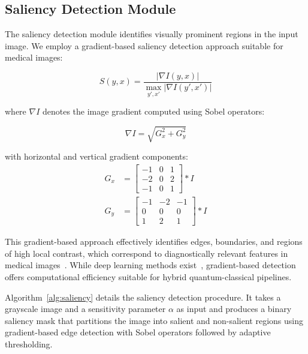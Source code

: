 \documentclass{ipol}
\begin{document}
\subsection{Saliency Detection Module}

The saliency detection module identifies visually prominent regions in the input image. We employ a gradient-based saliency detection approach suitable for medical images:

\begin{equation}
S(y, x) = \frac{|\nabla I(y, x)|}{\max_{y',x'} |\nabla I(y', x')|}
\label{eq:saliency_computation}
\end{equation}

where $\nabla I$ denotes the image gradient computed using Sobel operators:

\begin{equation}
\nabla I = \sqrt{G_x^2 + G_y^2}
\label{eq:gradient}
\end{equation}

with horizontal and vertical gradient components:
\begin{align}
G_x &= \begin{bmatrix} -1 & 0 & 1 \\ -2 & 0 & 2 \\ -1 & 0 & 1 \end{bmatrix} * I \\
G_y &= \begin{bmatrix} -1 & -2 & -1 \\ 0 & 0 & 0 \\ 1 & 2 & 1 \end{bmatrix} * I
\end{align}

This gradient-based approach effectively identifies edges, boundaries, and regions of high local contrast, which correspond to diagnostically relevant features in medical images~\cite{bib65,bib66,bib67}. While deep learning methods exist~\cite{bib56,bib57}, gradient-based detection offers computational efficiency suitable for hybrid quantum-classical pipelines.

Algorithm~\ref{alg:saliency} details the saliency detection procedure. It takes a grayscale image and a sensitivity parameter $\alpha$ as input and produces a binary saliency mask that partitions the image into salient and non-salient regions using gradient-based edge detection with Sobel operators followed by adaptive thresholding.
\end{document}
